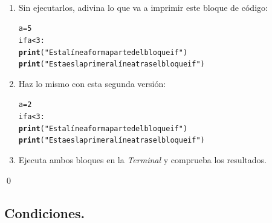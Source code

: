 \documentclass[10pt,a4paper]{article}\usepackage[]{graphicx}\usepackage[]{color}
\makeatletter
\newcommand{\hlstr}[1]{\textcolor[rgb]{0.192,0.494,0.8}{#1}}%
\newcommand{\hlkwd}[1]{\textcolor[rgb]{0.737,0.353,0.396}{\textbf{#1}}}%
\newenvironment{kframe}{%
 \def\at@end@of@kframe{}%
 \ifinner\ifhmode%
  \def\at@end@of@kframe{\end{minipage}}%
  \begin{minipage}{\columnwidth}%
 \fi\fi%
 \def\FrameCommand##1{\hskip\@totalleftmargin \hskip-\fboxsep
 \colorbox{shadecolor}{##1}\hskip-\fboxsep
     \hskip-\linewidth \hskip-\@totalleftmargin \hskip\columnwidth}%
 \MakeFramed {\advance\hsize-\width
   \@totalleftmargin\z@ \linewidth\hsize
   \@setminipage}}%
 {\par\unskip\endMakeFramed%
 \at@end@of@kframe}
\newenvironment{knitrout}{}{} %
\makeatother
\begin{document}
\begin{ejercicio}
\label{tut02:ejercicio29}
\quad\\
\begin{enumerate}
\item Sin ejecutarlos, adivina lo que va a imprimir este bloque de código:
\begin{knitrout}
\color{fgcolor}\begin{kframe}
\begin{alltt}
a = 5
if a < 3:
     \hlkwd{print}(\hlstr{"Esta línea forma parte del bloque if"})
\hlkwd{print}(\hlstr{"Esta es la primera línea tras el bloque if"})
\end{alltt}
\end{kframe}
\end{knitrout}
\item Haz lo mismo con esta segunda versión:
\begin{knitrout}
\color{fgcolor}\begin{kframe}
\begin{alltt}
a = 2
if a < 3:
     \hlkwd{print}(\hlstr{"Esta línea forma parte del bloque if"})
\hlkwd{print}(\hlstr{"Esta es la primera línea tras el bloque if"})
\end{alltt}
\end{kframe}
\end{knitrout}
\item Ejecuta ambos bloques en la {\em Terminal} y comprueba los resultados.
\end{enumerate}
\qed
\end{ejercicio}

\subsection{Condiciones.}
\label{tut02:subsec:Condiciones}
\end{document}
